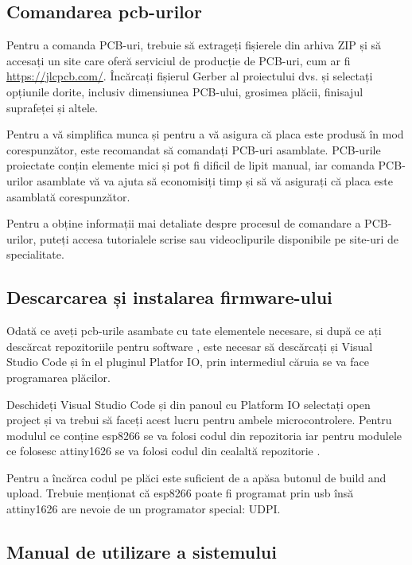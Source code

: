\subsection{Comandarea pcb-urilor}

Pentru a comanda PCB-uri, trebuie să extrageți fișierele din arhiva ZIP și să accesați un site care oferă serviciul de producție de PCB-uri, cum ar fi \url{https://jlcpcb.com/}. Încărcați fișierul Gerber al proiectului dvs. și selectați opțiunile dorite, inclusiv dimensiunea PCB-ului, grosimea plăcii, finisajul suprafeței și altele.

Pentru a vă simplifica munca și pentru a vă asigura că placa este produsă în mod corespunzător, este recomandat să comandați PCB-uri asamblate. PCB-urile proiectate conțin elemente mici și pot fi dificil de lipit manual, iar comanda PCB-urilor asamblate vă va ajuta să economisiți timp și să vă asigurați că placa este asamblată corespunzător. 

Pentru a obține informații mai detaliate despre procesul de comandare a PCB-urilor, puteți accesa tutorialele scrise sau videoclipurile disponibile pe site-uri de specialitate.

\subsection{Descarcarea și instalarea firmware-ului}
Odată ce aveți pcb-urile asambate cu tate elementele necesare, si după ce ați descărcat repozitoriile pentru software \cite{bmssoft} \cite{bmssoft32}, este necesar să descărcați și Visual Studio Code și în el pluginul Platfor IO, prin intermediul căruia se va face programarea plăcilor.

Deschideți Visual Studio Code și din panoul cu Platform IO selectați open project și va trebui să faceți acest lucru pentru ambele microcontrolere. Pentru modulul ce conține esp8266 se va folosi codul din repozitoria \cite{bmssoft} iar pentru modulele ce folosesc attiny1626 se va folosi codul din cealaltă repozitorie \cite{bmssoft32}.

Pentru a încărca codul pe plăci este suficient de a apăsa butonul de build and upload. Trebuie menționat că esp8266 poate fi programat prin usb însă attiny1626 are nevoie de un programator special: UDPI.

\subsection{Manual de utilizare a sistemului}

